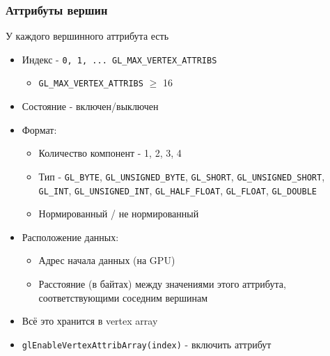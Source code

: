 \documentclass{beamer}
\begin{document}
\begin{frame}[fragile]
\frametitle{Аттрибуты вершин}
У каждого вершинного аттрибута есть
\begin{itemize}
\item Индекс - \verb|0, 1, ... GL_MAX_VERTEX_ATTRIBS|
\pause
\begin{itemize}
\item \verb|GL_MAX_VERTEX_ATTRIBS| \begin{math}\geq\end{math} 16
\end{itemize}
\pause
\item Состояние - включен/выключен
\pause
\item Формат:
\begin{itemize}
\item Количество компонент - 1, 2, 3, 4
\pause
\item Тип - \verb|GL_BYTE|, \verb|GL_UNSIGNED_BYTE|, \verb|GL_SHORT|, \verb|GL_UNSIGNED_SHORT|, \verb|GL_INT|, \verb|GL_UNSIGNED_INT|, \verb|GL_HALF_FLOAT|, \verb|GL_FLOAT|, \verb|GL_DOUBLE|
\pause
\item Нормированный / не нормированный
\end{itemize}
\pause
\item Расположение данных:
\begin{itemize}
\item Адрес начала данных (на GPU)
\item Расстояние (в байтах) между значениями этого аттрибута, соответствующими соседним вершинам
\end{itemize}
\pause
\item Всё это хранится в vertex array
\pause
\item \verb|glEnableVertexAttribArray(index)| - включить аттрибут
\end{itemize}
\end{frame}
\end{document}
